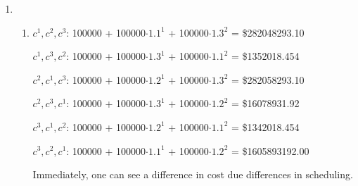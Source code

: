 \documentclass[11pt]{article}
\begin{document}
\begin{flushleft}
\begin{enumerate}
				      					      		      			\item {
				      					      		      				      \begin{enumerate}
				      					      		      				      	\item {
				      					      		      				      		      $c^1, c^2, c^3$: 100000 + 100000$\cdot 1.1^1$ + 100000$\cdot 1.3^2$ = \$282048293.10\linebreak
				      					      		      				      		      
				      					      		      				      		      $c^1, c^3, c^2$: 100000 + 100000$\cdot 1.3^1$ + 100000$\cdot 1.1^2$ = \$1352018.454\linebreak
				      					      		      				      		      
				      					      		      				      		      $c^2, c^1, c^3$: 100000 + 100000$\cdot 1.2^1$ + 100000$\cdot 1.3^2$ = \$282058293.10\linebreak
				      					      		      				      		      
				      					      		      				      		      $c^2, c^3, c^1$: 100000 + 100000$\cdot 1.3^1$ + 100000$\cdot 1.2^2$ = \$16078931.92\linebreak
				      					      		      				      		      
				      					      		      				      		      $c^3, c^1, c^2$: 100000 + 100000$\cdot 1.2^1$ + 100000$\cdot 1.1^2$ = \$1342018.454\linebreak
				      					      		      				      		      
				      					      		      				      		      $c^3, c^2, c^1$: 100000 + 100000$\cdot 1.1^1$ + 100000$\cdot 1.2^2$ = \$1605893192.00\linebreak
				      					      		      				      		      
				      					      		      				      		      Immediately, one can see a difference in cost due differences in scheduling.
				      					      		      				      		}
				      					      		      				      		

\end{enumerate}}
\end{enumerate}
\end{flushleft}
\end{document}

